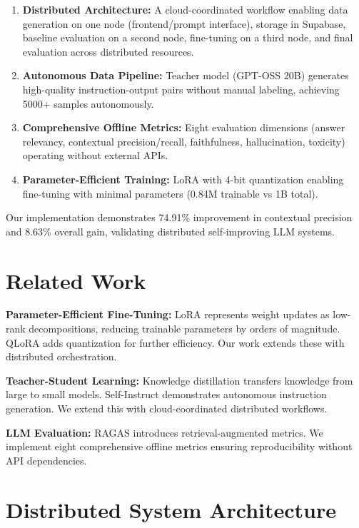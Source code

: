 \documentclass[conference]{IEEEtran}
\begin{document}
\begin{enumerate}
\item \textbf{Distributed Architecture:} A cloud-coordinated workflow enabling data generation on one node (frontend/prompt interface), storage in Supabase, baseline evaluation on a second node, fine-tuning on a third node, and final evaluation across distributed resources.

\item \textbf{Autonomous Data Pipeline:} Teacher model (GPT-OSS 20B) generates high-quality instruction-output pairs without manual labeling, achieving 5000+ samples autonomously.

\item \textbf{Comprehensive Offline Metrics:} Eight evaluation dimensions (answer relevancy, contextual precision/recall, faithfulness, hallucination, toxicity) operating without external APIs.

\item \textbf{Parameter-Efficient Training:} LoRA with 4-bit quantization enabling fine-tuning with minimal parameters (0.84M trainable vs 1B total).
\end{enumerate}

Our implementation demonstrates 74.91\% improvement in contextual precision and 8.63\% overall gain, validating distributed self-improving LLM systems.

\section{Related Work}

\textbf{Parameter-Efficient Fine-Tuning:} LoRA \cite{hu2021lora} represents weight updates as low-rank decompositions, reducing trainable parameters by orders of magnitude. QLoRA \cite{dettmers2023qlora} adds quantization for further efficiency. Our work extends these with distributed orchestration.

\textbf{Teacher-Student Learning:} Knowledge distillation \cite{hinton2015distilling} transfers knowledge from large to small models. Self-Instruct \cite{wang2022self} demonstrates autonomous instruction generation. We extend this with cloud-coordinated distributed workflows.

\textbf{LLM Evaluation:} RAGAS \cite{es2023ragas} introduces retrieval-augmented metrics. We implement eight comprehensive offline metrics ensuring reproducibility without API dependencies.

\section{Distributed System Architecture}
\end{document}
